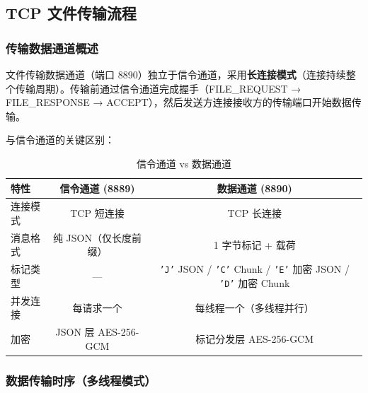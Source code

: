 \documentclass[12pt]{article}
\begin{document}
\subsection{TCP 文件传输流程}

\subsubsection{传输数据通道概述}

文件传输数据通道（端口 8890）独立于信令通道，采用\textbf{长连接模式}（连接持续整个传输周期）。传输前通过信令通道完成握手（FILE\_REQUEST → FILE\_RESPONSE → ACCEPT），然后发送方连接接收方的传输端口开始数据传输。

与信令通道的关键区别：

\begin{table}[H]
\centering
\caption{信令通道 vs 数据通道}
\begin{tabular}{lcc}
\toprule
\textbf{特性} & \textbf{信令通道 (8889)} & \textbf{数据通道 (8890)} \\
\midrule
连接模式 & TCP 短连接 & TCP 长连接 \\
消息格式 & 纯 JSON（仅长度前缀） & 1 字节标记 + 载荷 \\
标记类型 & — & \texttt{'J'} JSON / \texttt{'C'} Chunk / \texttt{'E'} 加密 JSON / \texttt{'D'} 加密 Chunk \\
并发连接 & 每请求一个 & 每线程一个（多线程并行） \\
加密 & JSON 层 AES-256-GCM & 标记分发层 AES-256-GCM \\
\bottomrule
\end{tabular}
\end{table}

\subsubsection{数据传输时序（多线程模式）}
\end{document}
